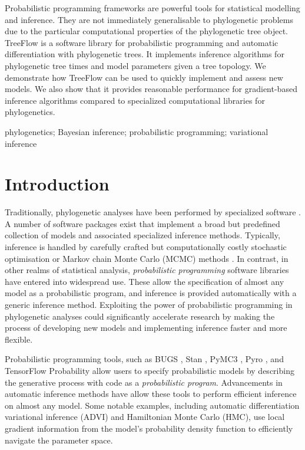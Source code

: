 Probabilistic programming frameworks are powerful tools for statistical modelling and inference. They are not immediately generalisable to phylogenetic problems due to the particular computational properties of the phylogenetic tree object. TreeFlow is a software library for probabilistic programming and automatic differentiation with phylogenetic trees. It implements inference algorithms for phylogenetic tree times and model parameters given a tree topology. We demonstrate how TreeFlow can be used to quickly implement and assess new models. We also show that it provides reasonable performance for gradient-based inference algorithms compared to specialized computational libraries for phylogenetics.

phylogenetics; Bayesian inference; probabilistic programming; variational inference


\section{Introduction}

Traditionally, phylogenetic analyses have been performed by specialized software \cite{stamatakis2014raxml, drummond2012bayesian, huelsenbeck2001mrbayes}. A number of software packages exist that implement a broad but predefined collection of models and associated specialized inference methods. Typically, inference is handled by carefully crafted but computationally costly stochastic optimisation or Markov chain Monte Carlo (MCMC) methods \cite{metropolis1953equation, hastings1970monte}. In contrast, in other realms of statistical analysis, \textit{probabilistic programming} software libraries have entered into widespread use. These allow the specification of almost any model as a probabilistic program, and inference is provided automatically with a generic inference method. Exploiting the power of probabilistic programming in phylogenetic analyses could significantly accelerate research by making the process of developing new models and implementing inference faster and more flexible.

Probabilistic programming tools, such as BUGS \cite{lunn2000winbugs}, Stan \cite{carpenter2017stan}, PyMC3 \cite{salvatier2016probabilistic}, Pyro \cite{bingham2019pyro}, and TensorFlow Probability \cite{dillon2017tensorflow} allow users to specify probabilistic models by describing the generative process with code as a \textit{probabilistic program}. Advancements in automatic inference methods have allow these tools to perform efficient inference on almost any model. Some notable examples, including automatic differentiation variational inference \cite{kucukelbir2017automatic} (ADVI) and Hamiltonian Monte Carlo \cite{duane1987hybrid} (HMC), use local  gradient information from the model's probability density function to efficiently navigate the parameter space.

